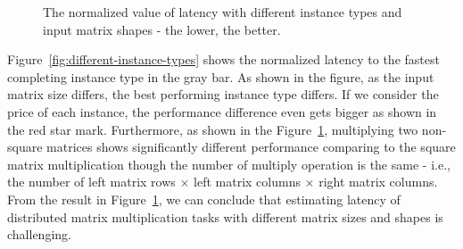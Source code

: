 \documentclass[10pt, conference, compsocconf]{IEEEtran}
\begin{document}
\begin{figure}[t]
  \centering
  \hfil\hfil\hfil\hfil\hfil\hfil\hfil\hfil\hfil\hfil{}
  \caption{\label{fig:instance-blocks-sizes-compare}The normalized value of latency with different instance types and input matrix shapes - the lower, the better.}
\end{figure}

Figure~\ref{fig:different-instance-types} shows the normalized latency to the fastest completing instance type in the gray bar. As shown in the figure, as the input matrix size differs, the best performing instance type differs. If we consider the price of each instance, the performance difference even gets bigger as shown in the red star mark. Furthermore, as shown in the Figure~\ref{fig:instance-blocks-sizes-compare}, multiplying two non-square matrices shows significantly different performance comparing to the square matrix multiplication though the number of multiply operation is the same - i.e., the number of left matrix rows $\times$ left matrix columns $\times$ right matrix columns. From the result in Figure~\ref{fig:instance-blocks-sizes-compare}, we can conclude that estimating latency of distributed matrix multiplication tasks with different matrix sizes and shapes is challenging. 
\end{document}
